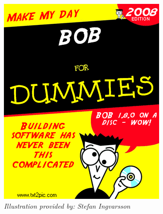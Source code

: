 \documentclass[a4paper]{article}
\begin{document}
\pagestyle{empty}

\begin{center}
\begin{figure}[hbt]
\includegraphics{bob_for_dummies.png} \\
\vspace*{0.2ex}
{\tiny\textit{Illustration provided by: Stefan Ingvarsson}}
\end{figure}
\end{center}


\end{document}
